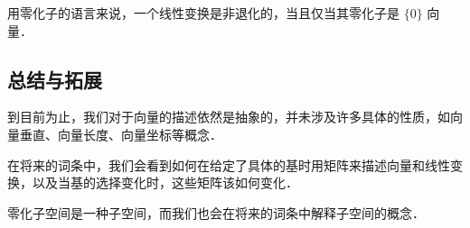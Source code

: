 用零化子的语言来说，一个线性变换是非退化的，当且仅当其零化子是 $\{{0}\}$ 向量．


\subsection{总结与拓展}

到目前为止，我们对于向量的描述依然是抽象的，并未涉及许多具体的性质，如向量垂直、向量长度、向量坐标等概念．

在将来的词条中，我们会看到如何在给定了具体的基时用矩阵来描述向量和线性变换，以及当基的选择变化时，这些矩阵该如何变化．

零化子空间是一种子空间，而我们也会在将来的词条中解释子空间的概念．
